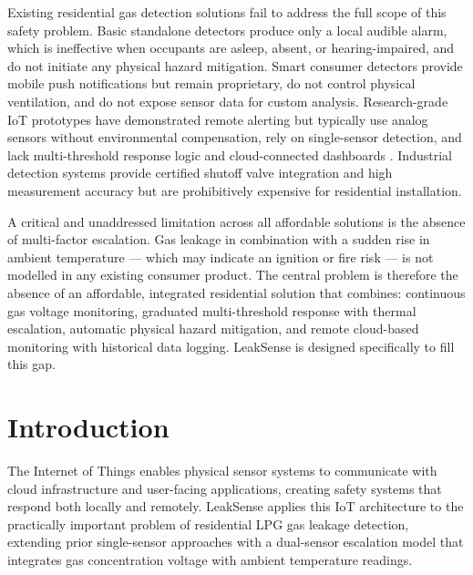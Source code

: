 \documentclass[a4paper,10pt,conference,onecolumn]{IEEEtran}
\begin{document}
Existing residential gas detection solutions fail to address the full scope of
this safety problem. Basic standalone detectors produce only a local audible
alarm, which is ineffective when occupants are asleep, absent, or
hearing-impaired, and do not initiate any physical hazard mitigation. Smart
consumer detectors provide mobile push notifications but remain proprietary,
do not control physical ventilation, and do not expose sensor data for custom
analysis. Research-grade IoT prototypes have demonstrated remote alerting but
typically use analog sensors without environmental compensation, rely on
single-sensor detection, and lack multi-threshold response logic and
cloud-connected dashboards \cite{islam2020}. Industrial detection systems
provide certified shutoff valve integration and high measurement accuracy but
are prohibitively expensive for residential installation.

A critical and unaddressed limitation across all affordable solutions is the
absence of multi-factor escalation. Gas leakage in combination with a sudden
rise in ambient temperature --- which may indicate an ignition or fire risk
--- is not modelled in any existing consumer product. The central problem is
therefore the absence of an affordable, integrated residential solution that
combines: continuous gas voltage monitoring, graduated multi-threshold
response with thermal escalation, automatic physical hazard mitigation, and
remote cloud-based monitoring with historical data logging. LeakSense is
designed specifically to fill this gap.

\section{Introduction}

The Internet of Things enables physical sensor systems to communicate with
cloud infrastructure and user-facing applications, creating safety systems
that respond both locally and remotely. LeakSense applies this IoT
architecture to the practically important problem of residential LPG gas
leakage detection, extending prior single-sensor approaches with a
dual-sensor escalation model that integrates gas concentration voltage with
ambient temperature readings.
\end{document}
